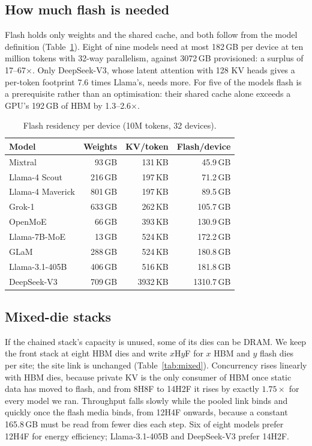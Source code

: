 \documentclass[conference,10pt]{IEEEtran}
\begin{document}
\subsection{How much flash is needed}
Flash holds only weights and the shared cache, and both follow from the model
definition (Table~\ref{tab:demand}). Eight of nine models need at most 182\,GB
per device at ten million tokens with 32-way parallelism, against 3072\,GB
provisioned: a surplus of 17--67$\times$. Only DeepSeek-V3, whose latent attention
with 128 KV heads gives a per-token footprint 7.6 times Llama's, needs more. For
five of the models flash is a prerequisite rather than an optimisation: their
shared cache alone exceeds a GPU's 192\,GB of HBM by 1.3--2.6$\times$.

\begin{table}[t]
\centering
\caption{Flash residency per device (10M tokens, 32 devices).}
\label{tab:demand}
\footnotesize
\begin{tabular}{@{}lrrr@{}}
\toprule
\textbf{Model} & \textbf{Weights} & \textbf{KV/token} & \textbf{Flash/device} \\
\midrule
Mixtral          &  93\,GB & 131\,KB &  45.9\,GB \\
Llama-4 Scout    & 216\,GB & 197\,KB &  71.2\,GB \\
Llama-4 Maverick & 801\,GB & 197\,KB &  89.5\,GB \\
Grok-1           & 633\,GB & 262\,KB & 105.7\,GB \\
OpenMoE          &  66\,GB & 393\,KB & 130.9\,GB \\
Llama-7B-MoE     &  13\,GB & 524\,KB & 172.2\,GB \\
GLaM             & 288\,GB & 524\,KB & 180.8\,GB \\
Llama-3.1-405B   & 406\,GB & 516\,KB & 181.8\,GB \\
DeepSeek-V3      & 709\,GB & 3932\,KB & 1310.7\,GB \\
\bottomrule
\end{tabular}
\end{table}

\subsection{Mixed-die stacks}
If the chained stack's capacity is unused, some of its dies can be DRAM. We keep
the front stack at eight HBM dies and write $x$H$y$F for $x$ HBM and $y$ flash
dies per site; the site link is unchanged (Table~\ref{tab:mixed}). Concurrency
rises linearly with HBM dies, because private KV is the only consumer of HBM once
static data has moved to flash, and from 8H8F to 14H2F it rises by exactly
$1.75\times$ for every model we ran. Throughput falls slowly while the pooled link
binds and quickly once the flash media binds, from 12H4F onwards, because a
constant 165.8\,GB must be read from fewer dies each step. Six of eight models
prefer 12H4F for energy efficiency; Llama-3.1-405B and DeepSeek-V3 prefer 14H2F.
\end{document}
